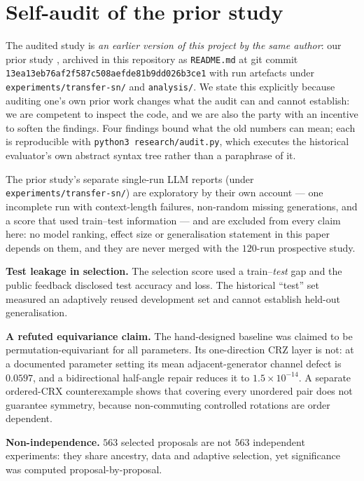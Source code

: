 \documentclass{neurips_2024}
\begin{document}
\section{Self-audit of the prior study}
\label{sec:audit}

The audited study is \emph{an earlier version of this project by the same author}:
our prior study \cite{ho2026prior}, archived in this repository as \texttt{README.md} at git commit
\texttt{13ea13eb76af2f587c508aefde81b9dd026b3ce1} with run artefacts under
\texttt{experiments/transfer-sn/} and \texttt{analysis/}. We state this explicitly because
auditing one's own prior work changes what the audit can and cannot establish: we are
competent to inspect the code, and we are also the party with an incentive to soften the
findings. Four findings bound what the old numbers can mean; each is reproducible with
\texttt{python3 research/audit.py}, which executes the historical evaluator's own
abstract syntax tree rather than a paraphrase of it.

The prior study's separate single-run LLM reports (under \texttt{experiments/transfer-sn/})
are exploratory by their own account --- one incomplete run with context-length failures,
non-random missing generations, and a score that used train--test information --- and are
excluded from every claim here: no model ranking, effect size or generalisation statement in
this paper depends on them, and they are never merged with the $120$-run prospective study.

\textbf{Test leakage in selection.} The selection score used a train--\emph{test} gap and
the public feedback disclosed test accuracy and loss. The historical ``test'' set measured
an adaptively reused development set and cannot establish held-out generalisation.

\textbf{A refuted equivariance claim.} The hand-designed baseline was claimed to be
permutation-equivariant for all parameters. Its one-direction CRZ layer is not: at a
documented parameter setting its mean adjacent-generator channel defect is $0.0597$, and a
bidirectional half-angle repair reduces it to $1.5\times10^{-14}$. A separate ordered-CRX
counterexample shows that covering every unordered pair does not guarantee symmetry,
because non-commuting controlled rotations are order dependent.

\textbf{Non-independence.} $563$ selected proposals are not $563$ independent experiments:
they share ancestry, data and adaptive selection, yet significance was computed
proposal-by-proposal.
\end{document}
